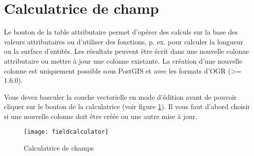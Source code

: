 \section{Calculatrice de champ}\label{sec:field_calculator}

Le bouton  de la table attributaire permet d'opérer des calculs sur la base des valeurs attributaires ou d'utiliser des fonctions, p. ex. pour calculer la longueur ou la surface d'entités. Les résultats peuvent être écrit dans une nouvelle colonne attributaire ou mettre à jour une colonne existante. La création d'une nouvelle colonne est uniquement possible sous PostGIS et avec les formats d'OGR (>= 1.6.0).

Vous devez basculer la couche vectorielle en mode d'édition avant de pouvoir cliquer sur le bouton de la calculatrice (voir figure \ref{fig:field_calculator}). Il vous faut d'abord choisir si une nouvelle colonne doit être créée ou une autre mise à jour.

\begin{figure}[ht]
  \centering
    \texttt{[image: fieldcalculator]}
    \caption{Calculatrice de champs \nixcaption}\label{fig:field_calculator}
\end{figure}

